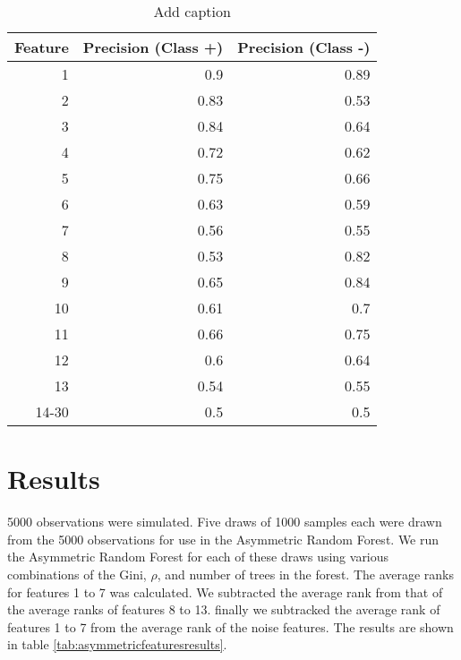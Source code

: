\begin{table}[htbp]
  \centering
  \caption{Add caption}
    \begin{tabular}{rrr}
    \hline
    Feature & Precision (Class +) & Precision (Class -) \bigstrut\\
    \hline
    1     & 0.9   & 0.89 \bigstrut[t]\\
    2     & 0.83  & 0.53 \\
    3     & 0.84  & 0.64 \\
    4     & 0.72  & 0.62 \\
    5     & 0.75  & 0.66 \\
    6     & 0.63  & 0.59 \\
    7     & 0.56  & 0.55 \\
    8     & 0.53  & 0.82 \\
    9     & 0.65  & 0.84 \\
    10    & 0.61  & 0.7 \\
    11    & 0.66  & 0.75 \\
    12    & 0.6   & 0.64 \\
    13    & 0.54  & 0.55 \\
    14-30 & 0.5   & 0.5 \bigstrut[b]\\
    \hline
    \end{tabular}%
  \label{tab:asymmetricfeatures1}%
\end{table}%

\section{Results}
5000 observations were simulated. Five draws of 1000 samples each were drawn from the 5000 observations for use in the Asymmetric Random Forest. We run the Asymmetric Random Forest for each of these draws using various combinations of the Gini, $\rho$, and number of trees in the forest. The average ranks for features 1 to 7 was calculated. We subtracted the average rank from that of the average ranks of features 8 to 13. finally we subtracked the average rank of features 1 to 7 from the average rank of the noise features. The results are shown in table \ref{tab:asymmetricfeaturesresults}.



